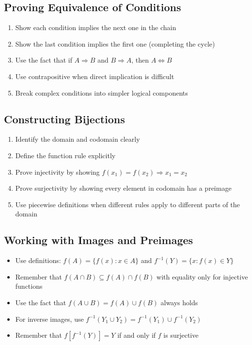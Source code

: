 \subsection*{Proving Equivalence of Conditions}
\begin{enumerate}
\item Show each condition implies the next one in the chain
\item Show the last condition implies the first one (completing the cycle)
\item Use the fact that if $A \Rightarrow B$ and $B \Rightarrow A$, then $A \iff B$
\item Use contrapositive when direct implication is difficult
\item Break complex conditions into simpler logical components
\end{enumerate}

\subsection*{Constructing Bijections}
\begin{enumerate}
\item Identify the domain and codomain clearly
\item Define the function rule explicitly
\item Prove injectivity by showing $f(x_1) = f(x_2) \Rightarrow x_1 = x_2$
\item Prove surjectivity by showing every element in codomain has a preimage
\item Use piecewise definitions when different rules apply to different parts of the domain
\end{enumerate}

\subsection*{Working with Images and Preimages}
\begin{itemize}
\item Use definitions: $f(A) = \{f(x) : x \in A\}$ and $f^{-1}(Y) = \{x : f(x) \in Y\}$
\item Remember that $f(A \cap B) \subseteq f(A) \cap f(B)$ with equality only for injective functions
\item Use the fact that $f(A \cup B) = f(A) \cup f(B)$ always holds
\item For inverse images, use $f^{-1}(Y_1 \cup Y_2) = f^{-1}(Y_1) \cup f^{-1}(Y_2)$
\item Remember that $f[f^{-1}(Y)] = Y$ if and only if $f$ is surjective
\end{itemize}